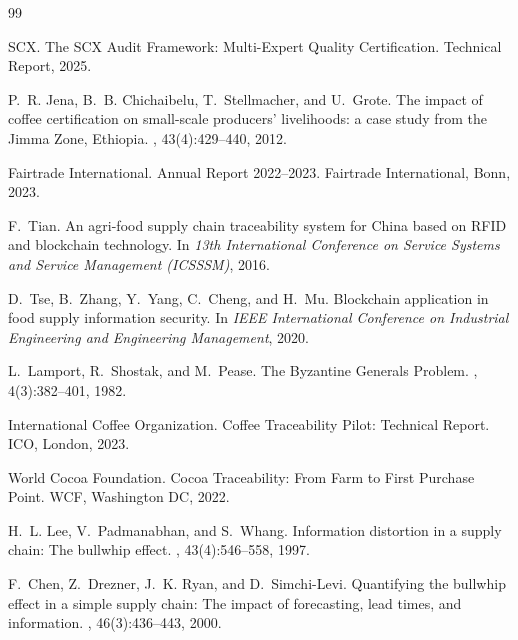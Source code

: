 \documentclass[11pt,a4paper]{article}
\theoremstyle{definition}
\theoremstyle{remark}
\begin{document}

\begin{thebibliography}{99}

SCX.
\newblock The SCX Audit Framework: Multi-Expert Quality Certification.
\newblock Technical Report, 2025.

P.~R. Jena, B.~B. Chichaibelu, T.~Stellmacher, and U.~Grote.
\newblock The impact of coffee certification on small-scale producers' livelihoods: a case study from the Jimma Zone, Ethiopia.
, 43(4):429--440, 2012.

Fairtrade International.
\newblock Annual Report 2022--2023.
\newblock Fairtrade International, Bonn, 2023.

F.~Tian.
\newblock An agri-food supply chain traceability system for China based on RFID and blockchain technology.
\newblock In {\em 13th International Conference on Service Systems and Service Management (ICSSSM)}, 2016.

D.~Tse, B.~Zhang, Y.~Yang, C.~Cheng, and H.~Mu.
\newblock Blockchain application in food supply information security.
\newblock In {\em IEEE International Conference on Industrial Engineering and Engineering Management}, 2020.

L.~Lamport, R.~Shostak, and M.~Pease.
\newblock The Byzantine Generals Problem.
, 4(3):382--401, 1982.

International Coffee Organization.
\newblock Coffee Traceability Pilot: Technical Report.
\newblock ICO, London, 2023.

World Cocoa Foundation.
\newblock Cocoa Traceability: From Farm to First Purchase Point.
\newblock WCF, Washington DC, 2022.

H.~L. Lee, V.~Padmanabhan, and S.~Whang.
\newblock Information distortion in a supply chain: The bullwhip effect.
, 43(4):546--558, 1997.

F.~Chen, Z.~Drezner, J.~K. Ryan, and D.~Simchi-Levi.
\newblock Quantifying the bullwhip effect in a simple supply chain: The impact of forecasting, lead times, and information.
, 46(3):436--443, 2000.


\end{thebibliography}
\end{document}
